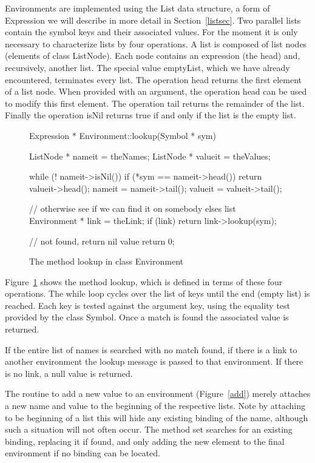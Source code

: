 Environments are implemented using the List data structure, a form of 
Expression we will describe in more detail in Section~\ref{listsec}.
Two parallel lists contain the symbol keys and their associated values.
For the moment it is only necessary to characterize lists by four
operations.   A list is composed of list nodes (elements of class {\sf
ListNode}).  Each node contains an expression (the head) and, recursively,
another list.  The special value {\sf emptyList}, which we have already
encountered, terminates every list.
The operation {\sf head} returns the first element of a list node.  
When provided with an argument, the operation {\sf head} can be used to
modify this first element.
The operation {\sf tail} returns the remainder of the list.
Finally the operation {\sf isNil} returns true if and only if the list is
the empty list.

\begin{figure}
\begin{cprog}
Expression * Environment::lookup(Symbol * sym)
{
	ListNode * nameit = theNames;
	ListNode * valueit = theValues;

	while (! nameit->isNil()) {
		if (*sym == nameit->head())
			return valueit->head();
		nameit = nameit->tail();
		valueit = valueit->tail();
		}

	// otherwise see if we can find it on somebody elses list
	Environment * link = theLink;
	if (link) return link->lookup(sym);

	// not found, return nil value
	return 0;
}
\end{cprog}
\caption{The method {\sf lookup} in class {\sf Environment}}\label{lookup}
\end{figure}

Figure~\ref{lookup} shows the method {\sf lookup}, which is defined in
terms of these four operations.  The while loop cycles over the list of
keys until the end (empty list) is reached.  Each key is tested against the
argument key, using the equality test provided by the class {\sf Symbol}.
Once a match is found the associated value is returned.

If the entire list of names is searched with no match found,
if there is a link to another environment the lookup message is passed to
that environment.  If there is no link, a null value is returned.

The routine to add a new value to an environment (Figure~\ref{add}) merely 
attaches a new name and value to the beginning of the respective lists.  
Note by attaching to be beginning of a list this will hide any existing 
binding of the name, although such a situation will not often occur.  
The method {\sf set} searches for an existing binding, replacing it if
found, and only adding the new element to the final environment if no 
binding can be located.

